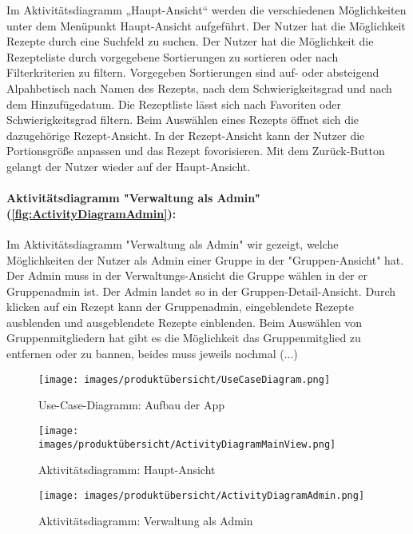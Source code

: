 \documentclass[parskip=full]{scrartcl}
\begin{document}
Im Aktivitätsdiagramm „Haupt-Ansicht“ werden die verschiedenen Möglichkeiten unter dem Menüpunkt Haupt-Ansicht aufgeführt.
Der Nutzer hat die Möglichkeit Rezepte durch eine Suchfeld zu suchen.
Der Nutzer hat die Möglichkeit die Rezepteliste durch vorgegebene Sortierungen zu sortieren oder nach Filterkriterien zu filtern.
Vorgegeben Sortierungen sind auf- oder absteigend Alpahbetisch nach Namen des Rezepts, nach dem Schwierigkeitsgrad und nach dem Hinzufügedatum.
Die Rezeptliste lässt sich nach Favoriten oder Schwierigkeitsgrad filtern.
Beim Auswählen eines Rezepts öffnet sich die dazugehörige Rezept-Ansicht.
In der Rezept-Ansicht kann der Nutzer die Portionsgröße anpassen und das Rezept fovorisieren.
Mit dem Zurück-Button gelangt der Nutzer wieder auf der Haupt-Ansicht.\par


\paragraph{Aktivitätsdiagramm "Verwaltung als Admin" (\autoref{fig:ActivityDiagramAdmin}):}

Im Aktivitätsdiagramm "Verwaltung als Admin" wir gezeigt, welche Möglichkeiten der Nutzer als Admin einer Gruppe in der "Gruppen-Ansicht" hat.
Der Admin muss in der Verwaltungs-Ansicht die Gruppe wählen in der er Gruppenadmin ist.
Der Admin landet so in der Gruppen-Detail-Ansicht.
Durch klicken auf ein Rezept kann der Gruppenadmin, eingeblendete Rezepte ausblenden und ausgeblendete Rezepte einblenden.
Beim Auswählen von Gruppenmitgliedern hat gibt es die Möglichkeit das Gruppenmitglied zu entfernen oder zu bannen, beides muss jeweils nochmal (...)
\newpage

\begin{figure}[!htp]
    \centering
    \begin{adjustbox}{right=160mm}
        \texttt{[image: images/produktübersicht/UseCaseDiagram.png]}
    \end{adjustbox}
    \caption{Use-Case-Diagramm: Aufbau der App}
    \label{fig:UseCaseDiagram}
\end{figure}
\newpage

\begin{figure}[!htp]
    \centering
    \texttt{[image: images/produktübersicht/ActivityDiagramMainView.png]}
    \caption{Aktivitätsdiagramm: Haupt-Ansicht}
    \label{fig:ActivityDiagramMainView}
\end{figure}
\newpage

\begin{figure}[!htp]
    \centering
    \begin{adjustbox}{right=150mm}
        \texttt{[image: images/produktübersicht/ActivityDiagramAdmin.png]}
    \end{adjustbox}
    \caption{Aktivitätsdiagramm: Verwaltung als Admin}
    \label{fig:ActivityDiagramAdmin}
\end{figure}
\newpage
\end{document}
